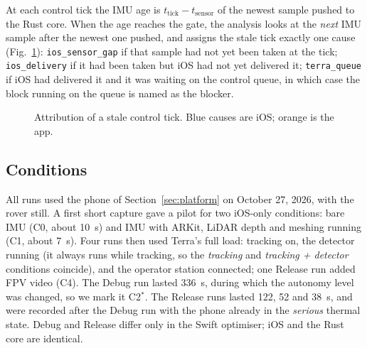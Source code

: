\documentclass[conference]{IEEEtran}
\newcommand{\tsens}{t_{\text{sensor}}}
\begin{document}
At each control tick the IMU age is $t_\text{tick} - \tsens$ of the newest sample pushed to the Rust core.
When the age reaches the gate, the analysis looks at the \emph{next} IMU sample after the newest one pushed, and assigns the stale tick exactly one cause (Fig.~\ref{fig:attrib}):
\texttt{ios\_sensor\_gap} if that sample had not yet been taken at the tick;
\texttt{ios\_delivery} if it had been taken but iOS had not yet delivered it;
\texttt{terra\_queue} if iOS had delivered it and it was waiting on the control queue, in which case the block running on the queue is named as the blocker.

\begin{figure}[t]
\centering
{}
\caption{Attribution of a stale control tick. Blue causes are iOS; orange is the app.}
\label{fig:attrib}
\end{figure}

\subsection{Conditions}

All runs used the phone of Section~\ref{sec:platform} on October 27, 2026, with the rover still.
A first short capture gave a pilot for two iOS-only conditions: bare IMU (C0, about 10~s) and IMU with ARKit, LiDAR depth and meshing running (C1, about 7~s).
Four runs then used Terra's full load: tracking on, the detector running (it always runs while tracking, so the \emph{tracking} and \emph{tracking + detector} conditions coincide), and the operator station connected; one Release run added FPV video (C4).
The Debug run lasted 336~s, during which the autonomy level was changed, so we mark it C2$^{*}$.
The Release runs lasted 122, 52 and 38~s, and were recorded after the Debug run with the phone already in the \emph{serious} thermal state.
Debug and Release differ only in the Swift optimiser; iOS and the Rust core are identical.
\end{document}
